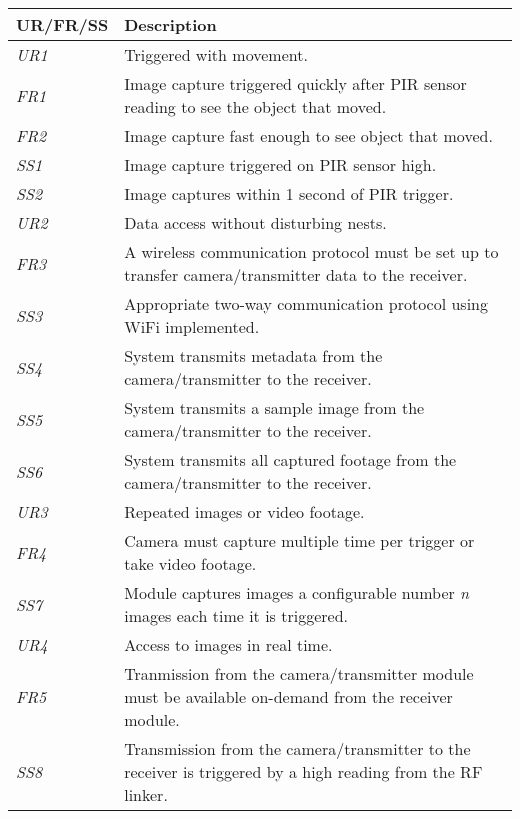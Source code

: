 \documentclass[class=report,11pt,crop=false]{standalone}
\begin{document}
\begin{table}[ht]
    \centering
    \begin{scriptsize}
    \begin{tabularx}{\textwidth}{|p{} X|}
        
        \hline
        \textbf{UR/FR/SS} & \textbf{Description}\\ \hline
        \textit{UR1} & Triggered with movement.\\
        \textit{FR1} & Image capture triggered quickly after PIR sensor reading to see the object that moved.\\
        \textit{FR2} & Image capture fast enough to see object that moved.\\
        \textit{SS1} & Image capture triggered on PIR sensor high.\\ 
        \textit{SS2} & Image captures within 1 second of PIR trigger.\\ \hline

        \textit{UR2} & Data access without disturbing nests.\\
        \textit{FR3} & A wireless communication protocol must be set up to transfer camera/transmitter data to the receiver.\\
        \textit{SS3} & Appropriate two-way communication protocol using WiFi implemented.\\
        \textit{SS4} & System transmits metadata from the camera/transmitter to the receiver.\\ 
        \textit{SS5} & System transmits a sample image from the camera/transmitter to the receiver.\\ 
        \textit{SS6} & System transmits all captured footage from the camera/transmitter to the receiver.\\ \hline

        \textit{UR3} & Repeated images or video footage.\\
        \textit{FR4} & Camera must capture multiple time per trigger or take video footage.\\
        \textit{SS7} & Module captures images a configurable number \textit{n} images each time it is triggered.\\ \hline

        \textit{UR4} & Access to images in real time.\\
        \textit{FR5} & Tranmission from the camera/transmitter module must be available on-demand from the receiver module.\\
        \textit{SS8} & Transmission from the camera/transmitter to the receiver is triggered by a high reading from the RF linker.\\ \hline


\end{tabularx}
\end{scriptsize}
\end{table}
\end{document}
